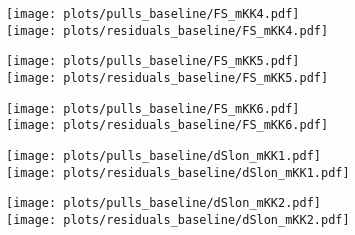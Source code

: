 \begin{subappendices}
\begin{figure}[H] 
  \centering
  \begin{multicols}{2}
  \texttt{[image: plots/pulls\_baseline/FS\_mKK4.pdf]}  \\
  \texttt{[image: plots/residuals\_baseline/FS\_mKK4.pdf]}
  \end{multicols}  
  \begin{multicols}{2}
  \texttt{[image: plots/pulls\_baseline/FS\_mKK5.pdf]}  \\
  \texttt{[image: plots/residuals\_baseline/FS\_mKK5.pdf]}
  \end{multicols}  
  \begin{multicols}{2}
  \texttt{[image: plots/pulls\_baseline/FS\_mKK6.pdf]}  \\
  \texttt{[image: plots/residuals\_baseline/FS\_mKK6.pdf]}
  \end{multicols}  
  \begin{multicols}{2}
  \texttt{[image: plots/pulls\_baseline/dSlon\_mKK1.pdf]}  \\
  \texttt{[image: plots/residuals\_baseline/dSlon\_mKK1.pdf]}
  \end{multicols}  
  \begin{multicols}{2}
  \texttt{[image: plots/pulls\_baseline/dSlon\_mKK2.pdf]}  \\
  \texttt{[image: plots/residuals\_baseline/dSlon\_mKK2.pdf]}
  \end{multicols}    
\end{figure}


\end{subappendices}
